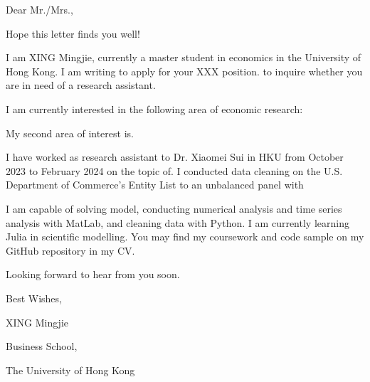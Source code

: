 \documentclass{article}
\begin{document}
\bigskip\bigskip %


\bigskip %

Dear Mr./Mrs.,

\bigskip %

Hope this letter finds you well!

I am XING Mingjie, currently a master student in economics in the University of Hong Kong. I am writing to apply for your XXX position. 
to inquire whether you are in need of a research assistant.

I am currently interested in the following area of economic research:

My second area of interest is.


I have worked as research assistant to Dr. Xiaomei Sui in HKU from October 2023 to February 2024 on the topic of. I conducted data cleaning on the U.S. Department of Commerce's Entity List to an unbalanced panel with 

I am capable of solving model, conducting numerical analysis and time series analysis with MatLab, and cleaning data with Python. I am currently learning Julia in scientific modelling. You may find my coursework and code sample on my GitHub repository in my CV.

Looking forward to hear from you soon.

\bigskip %

Best Wishes,

XING Mingjie %

Business School,

The University of Hong Kong 
\end{document}
